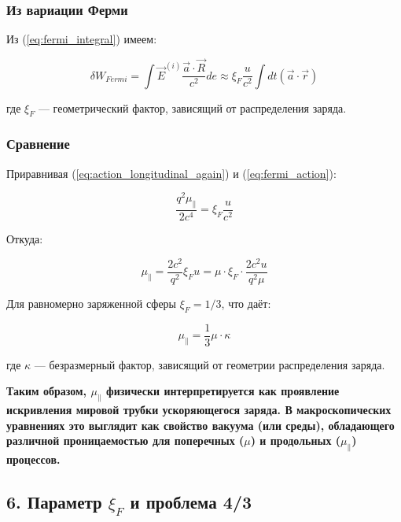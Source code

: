 \documentclass[12pt, a4paper]{article}
\begin{document}
\subsubsection{Из вариации Ферми}

Из (\ref{eq:fermi_integral}) имеем:

\begin{equation}
\delta W_{Fermi} = \int \vec{E}^{(i)} \frac{\vec{a} \cdot \vec{R}}{c^2} de \approx \xi_F \frac{u}{c^2} \int dt \left(\vec{a} \cdot \vec{r}\right)
\label{eq:fermi_action}
\end{equation}

где $\xi_F$ — геометрический фактор, зависящий от распределения заряда.

\subsubsection{Сравнение}

Приравнивая (\ref{eq:action_longitudinal_again}) и (\ref{eq:fermi_action}):

\begin{equation}
\frac{q^2\mu_{\parallel}}{2c^4} = \xi_F \frac{u}{c^2}
\label{eq:matching}
\end{equation}

Откуда:

\begin{equation}
\mu_{\parallel} = \frac{2c^2}{q^2} \xi_F u = \mu \cdot \xi_F \cdot \frac{2c^2 u}{q^2 \mu}
\label{eq:mu_parallel_final}
\end{equation}

Для равномерно заряженной сферы $\xi_F = 1/3$, что даёт:

\begin{equation}
\boxed{\mu_{\parallel} = \frac{1}{3} \mu \cdot \kappa}
\label{eq:mu_parallel_sphere}
\end{equation}

где $\kappa$ — безразмерный фактор, зависящий от геометрии распределения заряда.

\textbf{Таким образом, $\mu_{\parallel}$ физически интерпретируется как проявление искривления мировой трубки ускоряющегося заряда. В макроскопических уравнениях это выглядит как свойство вакуума (или среды), обладающего различной проницаемостью для поперечных ($\mu$) и продольных ($\mu_{\parallel}$) процессов.}

\subsection{6. Параметр $\xi_F$ и проблема 4/3}
\end{document}
